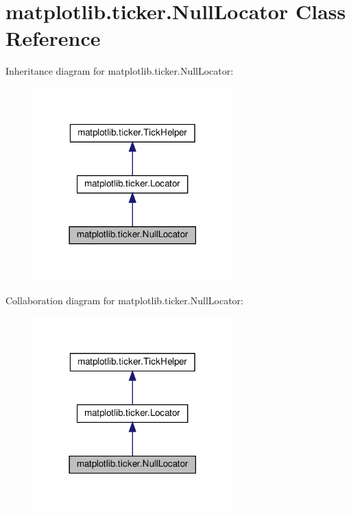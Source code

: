 \hypertarget{classmatplotlib_1_1ticker_1_1NullLocator}{}\section{matplotlib.\+ticker.\+Null\+Locator Class Reference}
\label{classmatplotlib_1_1ticker_1_1NullLocator}


Inheritance diagram for matplotlib.\+ticker.\+Null\+Locator\+:
\nopagebreak
\begin{figure}[H]
\begin{center}
\leavevmode
\includegraphics[width=218pt]{classmatplotlib_1_1ticker_1_1NullLocator__inherit__graph}
\end{center}
\end{figure}


Collaboration diagram for matplotlib.\+ticker.\+Null\+Locator\+:
\nopagebreak
\begin{figure}[H]
\begin{center}
\leavevmode
\includegraphics[width=218pt]{classmatplotlib_1_1ticker_1_1NullLocator__coll__graph}
\end{center}
\end{figure}
